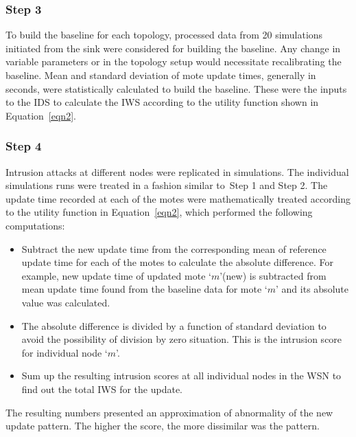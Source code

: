 \documentclass[conference,final]{IEEEtran}
\newcommand{\notedme}[1]{\raisebox{0pt}[0pt][0pt]{\pdfcomment[open=true,color=blue]{#1}}}
\begin{document}
\subsubsection*{Step 3} 
To build the baseline for each topology, processed data from 20 simulations initiated from the sink were considered for building the baseline.
Any change in variable parameters or in the topology setup would necessitate recalibrating the baseline.
Mean and standard deviation of mote update times, generally in seconds, were statistically calculated to build the baseline.
These were the inputs to the IDS to calculate the IWS according to the utility function shown in Equation~\ref{eqn2}. 


\subsubsection*{Step 4} 
Intrusion attacks at different nodes were replicated in simulations.
The individual simulations runs were treated in a fashion  similar to~Step 1 and Step 2.
The update time recorded at each of the motes were mathematically treated according to the utility function in Equation~\ref{eqn2}, which performed the following computations:
\begin{itemize}
\item Subtract the new update time from the corresponding mean of reference update time for each of the motes to calculate the absolute difference. For example, new update time of updated mote `$m$'(new) is subtracted from mean update time found from the baseline data for mote `$m$' and its absolute value was calculated.
\item The absolute difference is divided by a function of standard deviation to avoid the possibility of division by zero situation. 
This is the intrusion score for individual node `$m$'.
\item Sum up the resulting intrusion scores at all individual nodes in the WSN to find out the total IWS for the update.
\end{itemize}
The resulting numbers  presented an approximation of abnormality of the new update pattern. The higher the score, the more dissimilar was the pattern. 
\end{document}
